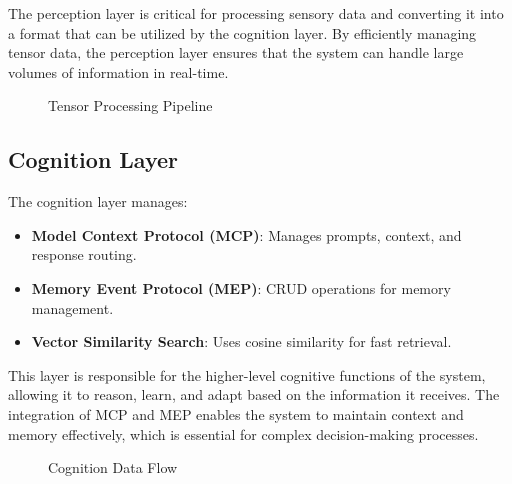 \documentclass[12pt]{article}
\begin{document}
The perception layer is critical for processing sensory data and converting it into a format that can be utilized by the cognition layer. By efficiently managing tensor data, the perception layer ensures that the system can handle large volumes of information in real-time.

\begin{figure}[H]
\centering
{}
\caption{Tensor Processing Pipeline}
\end{figure}

\subsection{Cognition Layer}
The cognition layer manages:
\begin{itemize}
  \item \textbf{Model Context Protocol (MCP)}: Manages prompts, context, and response routing.
  \item \textbf{Memory Event Protocol (MEP)}: CRUD operations for memory management.
  \item \textbf{Vector Similarity Search}: Uses cosine similarity for fast retrieval.
\end{itemize}

This layer is responsible for the higher-level cognitive functions of the system, allowing it to reason, learn, and adapt based on the information it receives. The integration of MCP and MEP enables the system to maintain context and memory effectively, which is essential for complex decision-making processes.

\begin{figure}[H]
\centering
{}
\caption{Cognition Data Flow}
\end{figure}
\end{document}
